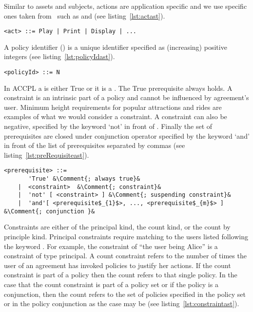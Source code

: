 Similar to assets and subjects, actions are application specific and we use specific ones taken from~\cite{pucella2006} such as  and  (see listing~\ref{lst:actast}).

\lstset{mathescape, language=AST}  
\begin{lstlisting}[frame=single, caption={act},label={lst:actast}]
<act> ::= Play | Print | Display | ...
\end{lstlisting}

A policy identifier () is a unique identifier specified as (increasing) positive integers (see listing~\ref{lst:policyIdast}).

\lstset{mathescape, language=AST}  
\begin{lstlisting}[frame=single, caption={policyId},label={lst:policyIdast}]
<policyId> ::= N
\end{lstlisting}

In \ac{ACCPL} a  is either True or it is a . The True prerequisite always holds. A constraint is an intrinsic part of a policy and cannot be influenced by agreement's user. Minimum height requirements for popular attractions and rides are examples of what we would consider a constraint. A constraint can also be negative, specified by the keyword `not' in front of . Finally the set of prerequisites are closed under conjunction operator specified by the keyword `and' in front of the list of prerequisites separated by commas (see listing~\ref{lst:preRequisiteast}).


\lstset{mathescape, language=AST, escapechar=\&}  
\begin{lstlisting}[frame=single, caption={prerequisite},label={lst:preRequisiteast}]
<prerequisite> ::=  
       'True' &\Comment{; always true}&
    |  <constraint>	 &\Comment{; constraint}&
    |  'not' [ <constraint> ] &\Comment{; suspending constraint}&
    |  'and'[ <prerequisite$_{1}$>, ..., <prerequisite$_{m}$> ] &\Comment{; conjunction }&
\end{lstlisting}

Constraints are either of the principal kind, the count kind, or the count by principle kind. Principal constraints require matching to the users listed following the keyword . For example, the constraint of ``the user being Alice'' is a constraint of type principal. A count constraint refers to the number of times the user of an agreement has invoked policies to justify her actions. If the count constraint is part of a policy then the count refers to that single policy. In the case that the count constraint is part of a policy set or if the policy is a conjunction, then the count refers to the set of policies specified in the policy set or in the policy conjunction as the case may be (see listing~\ref{lst:constraintast}).

